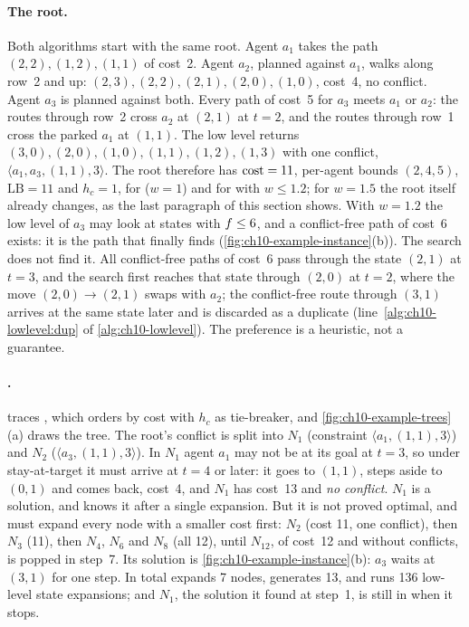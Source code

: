 \paragraph{The root.}
Both algorithms start with the same root. Agent $a_1$ takes the path
$(2,2), (1,2), (1,1)$ of cost~2. Agent $a_2$, planned against $a_1$, walks
along row~2 and up: $(2,3), (2,2), (2,1), (2,0), (1,0)$, cost~4, no conflict.
Agent $a_3$ is planned against both. Every path of cost~5 for $a_3$ meets
$a_1$ or $a_2$: the routes through row~2 cross $a_2$ at $(2,1)$ at $t = 2$,
and the routes through row~1 cross the parked $a_1$ at $(1,1)$. The low level
returns $(3,0), (2,0), (1,0), (1,1), (1,2), (1,3)$ with one conflict,
$\langle a_1, a_3, (1,1), 3\rangle$. The root therefore has $\operatorname{cost} = 11$,
per-agent bounds $(2, 4, 5)$, $\mathrm{LB} = 11$ and $h_c = 1$, for \cbs
($w = 1$) and for \ecbs with $w \le 1.2$; for $w = 1.5$ the root itself
already changes, as the last paragraph of this section shows. With $w = 1.2$
the low level
of $a_3$ may look at states with $f \le 6$, and a conflict-free path of
cost~6 exists: it is the path that \cbs finally finds
(\cref{fig:ch10-example-instance}(b)). The search does not find it. All
conflict-free paths of cost~6 pass through the state $(2,1)$ at $t = 3$, and
the search first reaches that state through $(2,0)$ at $t = 2$, where the move
$(2,0) \to (2,1)$ swaps with $a_2$; the conflict-free route through $(3,1)$
arrives at the same state later and is discarded as a duplicate
(line~\ref{alg:ch10-lowlevel:dup} of \cref{alg:ch10-lowlevel}). The \Focal
preference is a heuristic, not a guarantee.

\paragraph{\cbs.}
 traces \cbs, which orders \Open by cost with
$h_c$ as tie-breaker, and \cref{fig:ch10-example-trees}(a) draws the tree. The
root's conflict is split into $N_1$ (constraint $\langle a_1, (1,1), 3\rangle$)
and $N_2$ ($\langle a_3, (1,1), 3\rangle$). In $N_1$ agent $a_1$ may not be
at its goal at $t = 3$, so under stay-at-target it must arrive at $t = 4$ or
later: it goes to $(1,1)$, steps aside to $(0,1)$ and comes back, cost~4, and
$N_1$ has cost~13 and \emph{no conflict}. $N_1$ is a solution, and \cbs knows
it after a single expansion. But it is not proved optimal, and \cbs must
expand every node with a smaller cost first: $N_2$ (cost 11, one conflict),
then $N_3$ (11), then $N_4$, $N_6$ and $N_8$ (all 12), until $N_{12}$, of
cost~12 and without conflicts, is popped in step~7. Its solution is
\cref{fig:ch10-example-instance}(b): $a_3$ waits at $(3,1)$ for one step. In
total \cbs expands 7 nodes, generates 13, and runs 136 low-level state
expansions; and $N_1$, the solution it found at step~1, is still in \Open when
it stops.


